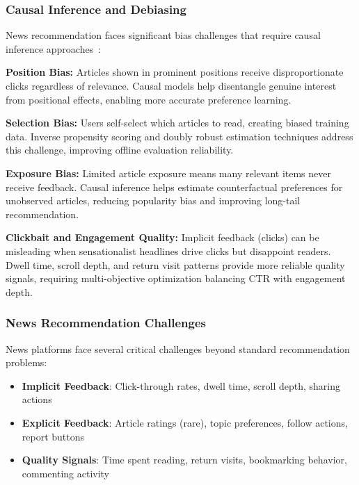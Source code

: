\subsubsection{Causal Inference and Debiasing}

News recommendation faces significant bias challenges that require causal inference approaches~\cite{qi2021causal}:

\textbf{Position Bias:} Articles shown in prominent positions receive disproportionate clicks regardless of relevance. Causal models help disentangle genuine interest from positional effects, enabling more accurate preference learning.

\textbf{Selection Bias:} Users self-select which articles to read, creating biased training data. Inverse propensity scoring and doubly robust estimation techniques address this challenge, improving offline evaluation reliability.

\textbf{Exposure Bias:} Limited article exposure means many relevant items never receive feedback. Causal inference helps estimate counterfactual preferences for unobserved articles, reducing popularity bias and improving long-tail recommendation.

\textbf{Clickbait and Engagement Quality:} Implicit feedback (clicks) can be misleading when sensationalist headlines drive clicks but disappoint readers. Dwell time, scroll depth, and return visit patterns provide more reliable quality signals, requiring multi-objective optimization balancing CTR with engagement depth.

\subsubsection{News Recommendation Challenges}

News platforms face several critical challenges beyond standard recommendation problems:

\begin{itemize}
    \item \textbf{Implicit Feedback}: Click-through rates, dwell time, scroll depth, sharing actions
    \item \textbf{Explicit Feedback}: Article ratings (rare), topic preferences, follow actions, report buttons
    \item \textbf{Quality Signals}: Time spent reading, return visits, bookmarking behavior, commenting activity
\end{itemize}


